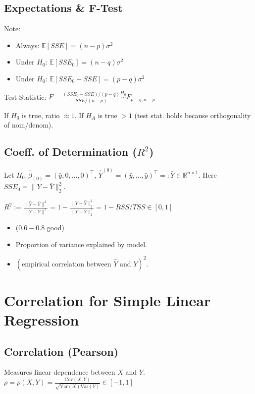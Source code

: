 \subsection*{Expectations \& F-Test}
Note:
\begin{itemize}
    \item Always: $\mathbb{E}[SSE] = (n-p)\sigma^2$
    \item Under $H_0$: $\mathbb{E}[SSE_0] = (n-q)\sigma^2$
    \item Under $H_0$: $\mathbb{E}[SSE_0 - SSE] = (p-q)\sigma^2$
\end{itemize}

Test Statistic:
$F = \frac{(SSE_0 - SSE)/(p-q)}{SSE/(n-p)} \overset{H_0}{\sim} F_{p-q, n-p}$

If $H_0$ is true, ratio $\approx 1$. If $H_A$ is true $> 1$ (test stat. holds because orthogonality of nom/denom).

\subsection{Coeff. of Determination ($R^2$)}
Let $H_0: \hat{\beta}_{(0)} = (\bar{y}, 0, \dots, 0)^\top$, $\hat{Y}^{(0)} = (\bar{y}, \dots, \bar{y})^\top =: \bar{Y} \in \mathbb{R}^{n \times 1}$. Here $SSE_0 = \|Y - \bar{Y}\|_2^2$.

$R^2 := \frac{\|\hat{Y} - \bar{Y}\|^2}{\|Y - \bar{Y}\|^2} = 1 - \frac{\|Y - \hat{Y}\|_2^2}{\|Y - \bar{Y}\|_2^2} = 1- RSS/TSS \in [0, 1]$

\begin{itemize}
    \item ($0.6{-}0.8$ good)\\
    \item Proportion of variance explained by model.
    \item $(\text{empirical correlation between } \hat{Y} \text{ and } Y)^2$.
\end{itemize}

\section{Correlation for Simple Linear Regression}
\subsection*{Correlation (Pearson)}
Measures linear dependence between $X$ and $Y$.
$\rho = \rho(X,Y) = \frac{\text{Cov}(X,Y)}{\sqrt{\text{Var}(X)\text{Var}(Y)}} \in [-1, 1]$

